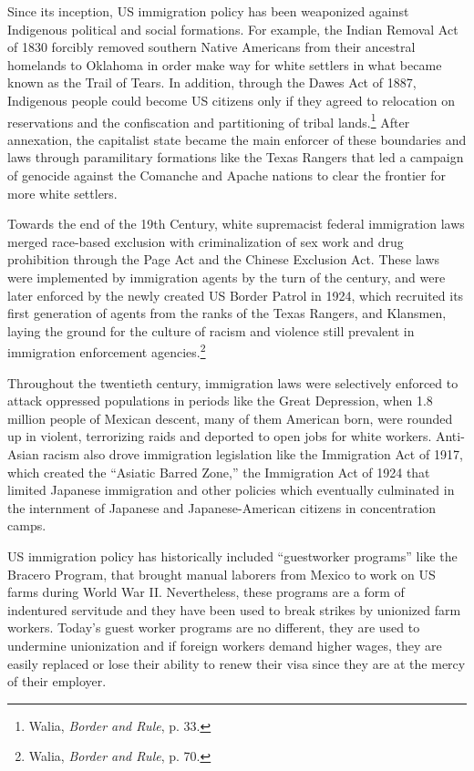 Since its inception, US immigration policy has been weaponized against Indigenous political and social formations. For example, the Indian Removal Act of 1830 forcibly removed southern Native Americans from their ancestral homelands to Oklahoma in order make way for white settlers in what became known as the Trail of Tears. In addition, through the Dawes Act of 1887, Indigenous people could become US citizens only if they agreed to relocation on reservations and the confiscation and partitioning of tribal lands.\footnote{Walia, \emph{Border and Rule}, p. 33.} After annexation, the capitalist state became the main enforcer of these boundaries and laws through paramilitary formations like the Texas Rangers that led a campaign of genocide against the Comanche and Apache nations to clear the frontier for more white settlers.

Towards the end of the 19th Century, white supremacist federal immigration laws merged race-based exclusion with criminalization of sex work and drug prohibition through the Page Act and the Chinese Exclusion Act. These laws were implemented by immigration agents by the turn of the century, and were later enforced by the newly created US Border Patrol in 1924, which recruited its first generation of agents from the ranks of the Texas Rangers, and Klansmen, laying the ground for the culture of racism and violence still prevalent in immigration enforcement agencies.\footnote{Walia, \emph{Border and Rule}, p. 70.}

Throughout the twentieth century, immigration laws were selectively enforced to attack oppressed populations in periods like the Great Depression, when 1.8 million people of Mexican descent, many of them American born, were rounded up in violent, terrorizing raids and deported to open jobs for white workers. Anti-Asian racism also drove immigration legislation like the Immigration Act of 1917, which created the ``Asiatic Barred Zone,'' the Immigration Act of 1924 that limited Japanese immigration and other policies which eventually culminated in the internment of Japanese and Japanese-American citizens in concentration camps.

US immigration policy has historically included ``guestworker programs'' like the Bracero Program, that brought manual laborers from Mexico to work on US farms during World War II. Nevertheless, these programs are a form of indentured servitude and they have been used to break strikes by unionized farm workers. Today's guest worker programs are no different, they are used to undermine unionization and if foreign workers demand higher wages, they are easily replaced or lose their ability to renew their visa since they are at the mercy of their employer.

